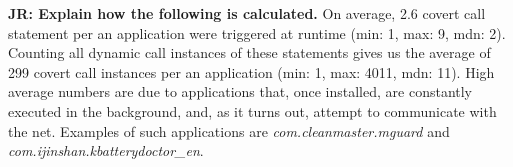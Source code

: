 {\bf JR: Explain how the following is calculated.}
On average, 2.6 covert call statement per an application were triggered at runtime  (min: 1, max: 9, mdn: 2). 
Counting all dynamic call instances of these statements gives us the average of 
299 covert call instances per an application (min: 1, max: 4011, mdn: 11). 
High average numbers are due to applications that, once installed, are constantly executed in the background,
and, as it turns out, attempt to communicate with the net. Examples of such applications are  \emph{com.cleanmaster.mguard} and \emph{com.ijinshan.kbatterydoctor\_en}.





